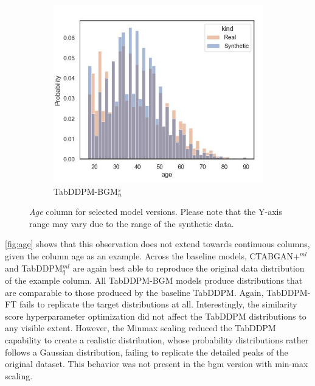 \begin{figure}[h]
	\begin{subfigure}{0.32\textwidth}
		\centering
		\includegraphics[width=\textwidth]{images/dist_age/tab-ddpm-bgm-simTune-none.jpg}
		\caption{TabDDPM-BGM$^{s}_n$}
	\end{subfigure}
	\caption[Distribution Plots Continuous]{\textit{Age} column for selected model versions. Please note that the Y-axis range may vary due to the range of the synthetic data.}
	\label{fig:age}
\end{figure}

\autoref{fig:age} shows that this observation does not extend towards continuous columns, given the column age as an example.
Across the baseline models, CTABGAN+$^{ml}$ and TabDDPM$^{ml}_q$ are again best able to reproduce the original data distribution of the example column.
All TabDDPM-BGM models produce distributions that are comparable to those produced by the baseline TabDDPM.
Again, TabDDPM-FT fails to replicate the target distributions at all.
Interestingly, the similarity score hyperparameter optimization did not affect the TabDDPM distributions to any visible extent.
However, the Minmax scaling reduced the TabDDPM capability to create a realistic distribution, whose probability distributions rather follows a Gaussian distribution, failing to replicate the detailed peaks of the original dataset.
This behavior was not present in the \gls{bgm} version with min-max scaling.


